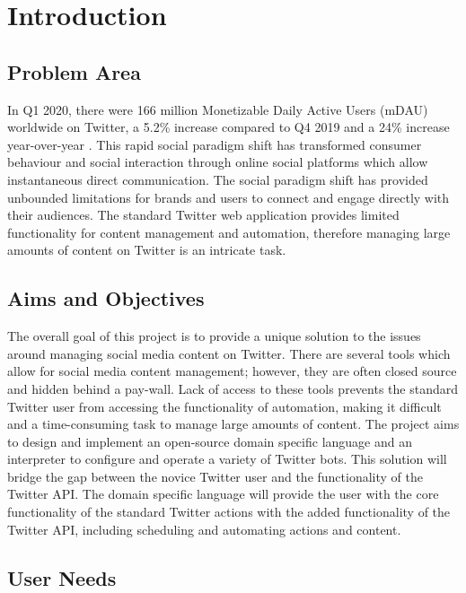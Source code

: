 \renewcommand{\chaptername}{}

\chapter{Introduction}

\section{Problem Area}

In Q1 2020, there were 166 million Monetizable Daily Active Users (mDAU) worldwide on Twitter, a 5.2\% increase compared to Q4 2019 and a 24\% increase year-over-year \cite{twitter2020}. This rapid social paradigm shift has transformed consumer behaviour and social interaction through online social platforms which allow instantaneous direct communication. The social paradigm shift has provided unbounded limitations for brands and users to connect and engage directly with their audiences. The standard Twitter web application provides limited functionality for content management and automation, therefore managing large amounts of content on Twitter is an intricate task.

\section{Aims and Objectives}

The overall goal of this project is to provide a unique solution to the issues around managing social media content on Twitter. There are several tools which allow for social media content management; however, they are often closed source and hidden behind a pay-wall. Lack of access to these tools prevents the standard Twitter user from accessing the functionality of automation, making it difficult and a time-consuming task to manage large amounts of content. The project aims to design and implement an open-source domain specific language and an interpreter to configure and operate a variety of Twitter bots. This solution will bridge the gap between the novice Twitter user and the functionality of the Twitter API. The domain specific language will provide the user with the core functionality of the standard Twitter actions with the added functionality of the Twitter API, including scheduling and automating actions and content.

\section{User Needs}

